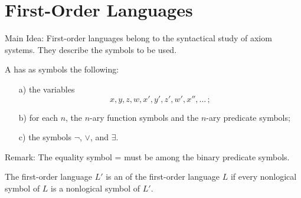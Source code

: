 
\newpage

\section{First-Order Languages}

Main Idea: First-order languages belong to the syntactical study of 
axiom systems. They describe the symbols to be used.

\begin{definition}
	A  
	has as symbols the following:
	\begin{enumerate}
		\item[a)] the variables
		\[ x,y,z,w,x',y',z',w',x'', \dots \,; \]
		
		\item[b)] for each $n$, the $n$-ary function symbols and 
		the $n$-ary predicate symbols;
		
		\item[c)] the symbols $\neg$, $\lor$, and $\exists$.
	\end{enumerate}
\end{definition}

Remark: The equality symbol = must be among the binary predicate 
symbols.

The first-order language $L'$ is an 
 of the 
first-order language $L$ if every nonlogical symbol of $L$ is a 
nonlogical symbol of $L'$.

